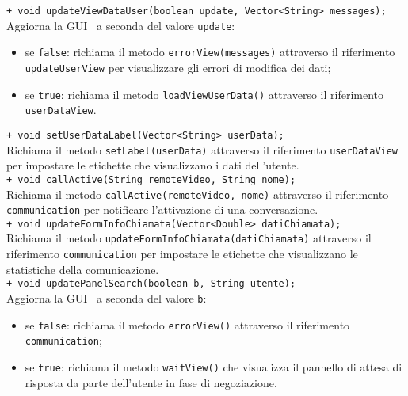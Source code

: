 {\begin{sloppypar}
{\begin{itemize}
\begin{itemize}
			\texttt{+ void updateViewDataUser(boolean update, Vector<String> messages);}\\
			Aggiorna la GUI\g~ a seconda del valore \texttt{update}:
			\begin{itemize}
				\item se \texttt{false}: richiama il metodo \texttt{errorView(messages)} attraverso il riferimento \texttt{updateUserView} per visualizzare gli errori di modifica dei dati;
				\item se \texttt{true}: richiama il metodo \texttt{loadViewUserData()} attraverso il riferimento \texttt{userDataView}.\\
			\end{itemize}

			\texttt{+ void setUserDataLabel(Vector<String> userData);}\\
			Richiama il metodo \texttt{setLabel(userData)} attraverso il riferimento \texttt{userDataView} per impostare le etichette che visualizzano i dati dell’utente.\\

			\texttt{+ void callActive(String remoteVideo, String nome);}\\
			Richiama il metodo \texttt{callActive(remoteVideo, nome)} attraverso il riferimento \texttt{communication} per notificare l’attivazione di una conversazione.\\

			\texttt{+ void updateFormInfoChiamata(Vector<Double> datiChiamata);}\\
			Richiama il metodo \texttt{updateFormInfoChiamata(datiChiamata)} attraverso il riferimento \texttt{communication} per impostare le etichette che visualizzano le statistiche della comunicazione.\\

			\texttt{+ void updatePanelSearch(boolean b, String utente);}\\
			Aggiorna la GUI\g~ a seconda del valore \texttt{b}:
			\begin{itemize}
				\item se \texttt{false}: richiama il metodo \texttt{errorView()} attraverso il riferimento \texttt{communication};
				\item se \texttt{true}: richiama il metodo \texttt{waitView()} che visualizza il pannello di attesa di risposta da parte dell’utente in fase di negoziazione.\\
			\end{itemize}

		\end{itemize}
	\end{itemize}
	}


\end{sloppypar}}
